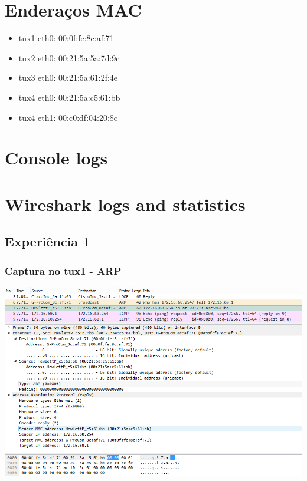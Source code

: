 \documentclass[11pt,a4paper,reqno]{report}
\numberwithin{equation}{section}
\begin{document}
\begin{appendices}

\chapter{Enderaços MAC}
\label{mac_addresses}
\begin{itemize} 
\item tux1 eth0: 00:0f:fe:8c:af:71
\item tux2 eth0: 00:21:5a:5a:7d:9c
\item tux3 eth0: 00:21:5a:61:2f:4e
\item tux4 eth0: 00:21:5a:c5:61:bb
\item tux4 eth1: 00:c0:df:04:20:8c
\end{itemize}

\chapter{Console logs}%

\chapter{Wireshark logs and statistics}%

\section{Experiência 1}%
\label{ex1_headers}
\subsection{Captura no tux1 - ARP}
\includegraphics[width=16cm]{ex1_arp.png}

\end{appendices}
\end{document}
